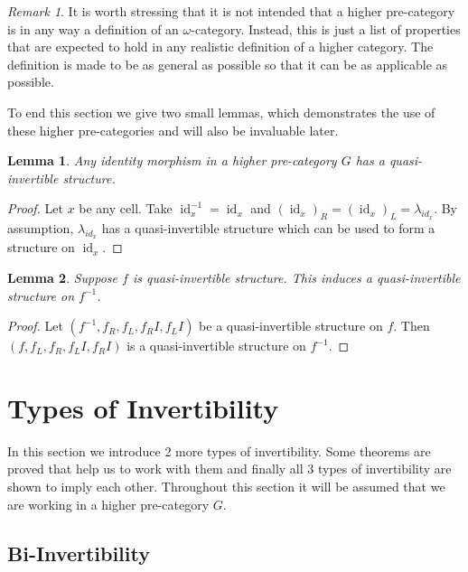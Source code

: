 \documentclass{article}
\newtheorem{lemma}{Lemma}
\theoremstyle{definition}
\theoremstyle{remark}
\newtheorem{remark}{Remark}
\DeclareMathOperator{\id}{id}
\newcommand{\inv}[1]{#1^{-1}}
\begin{document}
\begin{remark}
  It is worth stressing that it is not intended that a higher pre-category is in any way a definition of an \(\omega\)-category. Instead, this is just a list of properties that are expected to hold in any realistic definition of a higher category. The definition is made to be as general as possible so that it can be as applicable as possible.
\end{remark}

To end this section we give two small lemmas, which demonstrates the use of these higher pre-categories and will also be invaluable later.

\begin{lemma}\label{identity}
  Any identity morphism in a higher pre-category \(G\) has a quasi-invertible structure.
\end{lemma}

\begin{proof}
  Let \(x\) be any cell. Take \(\inv {\id_x} = \id_x\) and \({(\id_x)}_R = {(\id_x)}_L = \lambda_{id_x}\). By assumption, \(\lambda_{id_x}\) has a quasi-invertible structure which can be used to form a structure on \(\id_x\).
\end{proof}

\begin{lemma}\label{inverse-invert}
  Suppose \(f\) is quasi-invertible structure. This induces a quasi-invertible structure on \(\inv f\).
\end{lemma}

\begin{proof}
  Let \((\inv f, f_R, f_L, f_R{}I, f_L{}I)\) be a quasi-invertible structure on \(f\). Then \((f , f_L, f_R, f_L{}I, f_R{}I)\) is a quasi-invertible structure on \(\inv f\).
\end{proof}

\section{Types of Invertibility}\label{sec:invertibility}

In this section we introduce 2 more types of invertibility. Some theorems are proved that help us to work with them and finally all 3 types of invertibility are shown to imply each other. Throughout this section it will be assumed that we are working in a higher pre-category \(G\).

\subsection{Bi-Invertibility}\label{sec:bi-invertibility}
\end{document}
